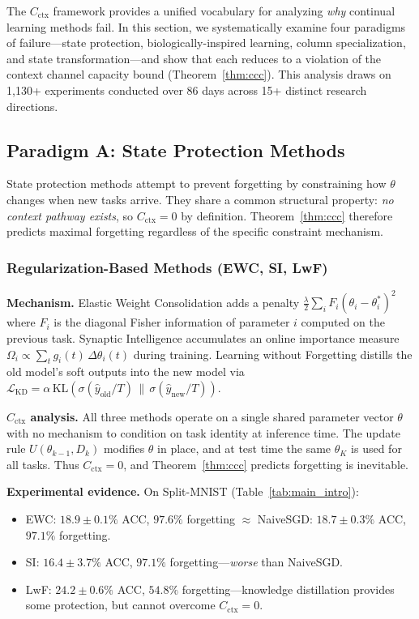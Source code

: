 \documentclass{article}
\begin{document}
The $C_\mathrm{ctx}$ framework provides a unified vocabulary for analyzing \emph{why} continual learning methods fail.
In this section, we systematically examine four paradigms of failure---state protection, biologically-inspired learning, column specialization, and state transformation---and show that each reduces to a violation of the context channel capacity bound (Theorem~\ref{thm:ccc}).
This analysis draws on 1,130+ experiments conducted over 86 days across 15+ distinct research directions.

\subsection{Paradigm A: State Protection Methods}
\label{sec:state_protection}

State protection methods attempt to prevent forgetting by constraining how $\theta$ changes when new tasks arrive.
They share a common structural property: \emph{no context pathway exists}, so $C_\mathrm{ctx} = 0$ by definition.
Theorem~\ref{thm:ccc} therefore predicts maximal forgetting regardless of the specific constraint mechanism.

\subsubsection{Regularization-Based Methods (EWC, SI, LwF)}

\textbf{Mechanism.} Elastic Weight Consolidation \citep{kirkpatrick2017overcoming} adds a penalty $\frac{\lambda}{2}\sum_i F_i(\theta_i - \theta_{i}^{*})^2$ where $F_i$ is the diagonal Fisher information of parameter $i$ computed on the previous task. Synaptic Intelligence \citep{zenke2017continual} accumulates an online importance measure $\Omega_i \propto \sum_t g_i(t)\,\Delta\theta_i(t)$ during training. Learning without Forgetting \citep{li2017learning} distills the old model's soft outputs into the new model via $\mathcal{L}_\mathrm{KD} = \alpha\,\mathrm{KL}(\sigma(\hat{y}_\mathrm{old}/T) \,\|\, \sigma(\hat{y}_\mathrm{new}/T))$.

\textbf{$C_\mathrm{ctx}$ analysis.} All three methods operate on a single shared parameter vector $\theta$ with no mechanism to condition on task identity at inference time. The update rule $U(\theta_{k-1}, D_k)$ modifies $\theta$ in place, and at test time the same $\theta_K$ is used for all tasks. Thus $C_\mathrm{ctx} = 0$, and Theorem~\ref{thm:ccc} predicts forgetting is inevitable.

\textbf{Experimental evidence.} On Split-MNIST (Table~\ref{tab:main_intro}):
\begin{itemize}
    \item EWC: $18.9 \pm 0.1\%$ ACC, $97.6\%$ forgetting $\approx$ NaiveSGD: $18.7 \pm 0.3\%$ ACC, $97.1\%$ forgetting.
    \item SI: $16.4 \pm 3.7\%$ ACC, $97.1\%$ forgetting---\emph{worse} than NaiveSGD.
    \item LwF: $24.2 \pm 0.6\%$ ACC, $54.8\%$ forgetting---knowledge distillation provides some protection, but cannot overcome $C_\mathrm{ctx} = 0$.
\end{itemize}
\end{document}
